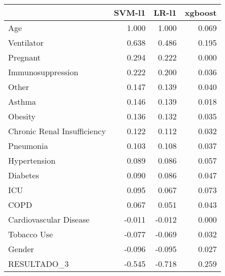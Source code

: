 \begin{tabular}{lrrr}
\toprule
{} &  SVM-l1 &  LR-l1 &  xgboost \\
\midrule
Age                         &   1.000 &  1.000 &    0.069 \\
Ventilator                  &   0.638 &  0.486 &    0.195 \\
Pregnant                    &   0.294 &  0.222 &    0.000 \\
Immunosuppression           &   0.222 &  0.200 &    0.036 \\
Other                       &   0.147 &  0.139 &    0.040 \\
Asthma                      &   0.146 &  0.139 &    0.018 \\
Obesity                     &   0.136 &  0.132 &    0.035 \\
Chronic Renal Insufficiency &   0.122 &  0.112 &    0.032 \\
Pneumonia                   &   0.103 &  0.108 &    0.037 \\
Hypertension                &   0.089 &  0.086 &    0.057 \\
Diabetes                    &   0.090 &  0.086 &    0.047 \\
ICU                         &   0.095 &  0.067 &    0.073 \\
COPD                        &   0.067 &  0.051 &    0.043 \\
Cardiovascular Disease      &  -0.011 & -0.012 &    0.000 \\
Tobacco Use                 &  -0.077 & -0.069 &    0.032 \\
Gender                      &  -0.096 & -0.095 &    0.027 \\
RESULTADO\_3                 &  -0.545 & -0.718 &    0.259 \\
\bottomrule
\end{tabular}
